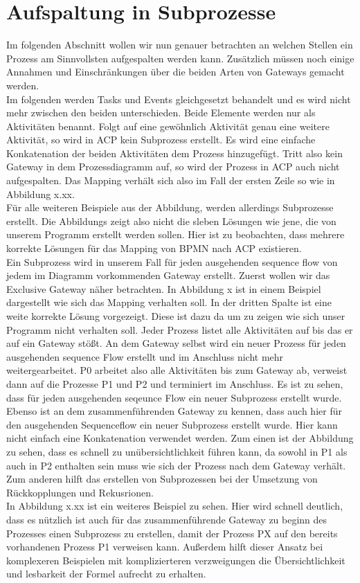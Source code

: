 \section {Aufspaltung in Subprozesse}
Im folgenden Abschnitt wollen wir nun genauer betrachten an welchen Stellen ein Prozess am Sinnvollsten aufgespalten werden kann. Zusätzlich müssen noch einige Annahmen und Einschränkungen über die beiden Arten von Gateways gemacht werden.\\
Im folgenden werden Tasks und Events gleichgesetzt behandelt und es wird nicht mehr zwischen den beiden unterschieden. Beide Elemente werden nur als Aktivitäten benannt. Folgt auf eine gewöhnlich Aktivität genau eine weitere Aktivität, so wird in ACP kein Subprozess erstellt. Es wird eine einfache Konkatenation der beiden Aktivitäten dem Prozess hinzugefügt. Tritt also kein Gateway in dem Prozessdiagramm auf, so wird der Prozess in ACP auch nicht aufgespalten. Das Mapping verhält sich also im Fall der ersten Zeile so wie in Abbildung x.xx.\\
Für alle weiteren Beispiele aus der Abbildung, werden allerdings Subprozesse erstellt. Die Abbildungs zeigt also nicht die sleben Lösungen wie jene, die von unserem Programm erstellt werden sollen. Hier ist zu beobachten, dass mehrere korrekte Lösungen für das Mapping von BPMN nach ACP existieren.\\
Ein Subprozess wird in unserem Fall für jeden ausgehenden sequence flow von jedem im Diagramm vorkommenden Gateway erstellt. Zuerst wollen wir das Exclusive Gateway näher betrachten. In Abbildung x ist in einem Beispiel dargestellt wie sich das Mapping verhalten soll. In der dritten Spalte ist eine weite korrekte Lösung vorgezeigt. Diese ist dazu da um zu zeigen wie sich unser Programm nicht verhalten soll. Jeder Prozess listet alle Aktivitäten auf bis das er auf ein Gateway stößt. An dem Gateway selbst wird ein neuer Prozess für jeden ausgehenden sequence Flow erstellt und im Anschluss nicht mehr weitergearbeitet. P0 arbeitet also alle Aktivitäten bis zum Gateway ab, verweist dann auf die Prozesse P1 und P2 und terminiert im Anschluss. Es ist zu sehen, dass für jeden ausgehenden seqeunce Flow ein neuer Subprozess erstellt wurde.\\ 
Ebenso ist an dem zusammenführenden Gateway zu kennen, dass auch hier für den ausgehenden Sequenceflow ein neuer Subprozess erstellt wurde. Hier kann nicht einfach eine Konkatenation verwendet werden. Zum einen ist der Abbildung zu sehen, dass es schnell zu unübersichtlichkeit führen kann, da sowohl in P1 als auch in P2 enthalten sein muss wie sich der Prozess nach dem Gateway verhält. Zum anderen hilft das erstellen von Subprozessen bei der Umsetzung von Rückkopplungen und Rekusrionen.\\
In Abbildung x.xx ist ein weiteres Beispiel zu sehen. Hier wird schnell deutlich, dass es nützlich ist auch für das zusammenführende Gateway zu beginn des Prozesses einen Subprozess zu erstellen, damit der Prozess PX auf den bereits vorhandenen Prozess P1 verweisen kann. Außerdem hilft dieser Ansatz bei komplexeren Beispielen mit komplizierteren verzweigungen die Übersichtlichkeit und lesbarkeit der Formel aufrecht zu erhalten.\\


